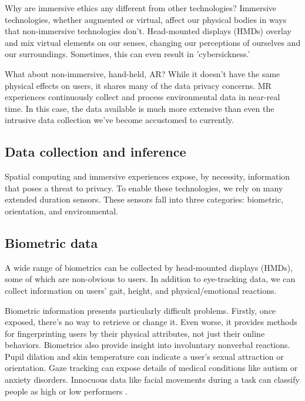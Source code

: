 Why are immersive ethics any different from other technologies? Immersive technologies, whether augmented or virtual, affect our physical bodies in ways that non-immersive technologies don't. Head-mounted displays (HMDs) overlay and mix virtual elements on our senses, changing our perceptions of ourselves and our surroundings. Sometimes, this can even result in 'cybersickness.'

What about non-immersive, hand-held, AR? While it doesn't have the same physical effects on users, it shares many of the data privacy concerns. MR experiences continuously collect and process environmental data in near-real time. In this case, the data available is much more extensive than even the intrusive data collection we've become accustomed to currently.

\subsection{Data collection and inference}
Spatial computing and immersive experiences expose, by necessity, information that poses a threat to privacy. To enable these technologies, we rely on many extended duration sensors. These sensors fall into three categories: biometric, orientation, and environmental.

\subsection{Biometric data}\label{sec:biometrics}
A wide range of biometrics can be collected by head-mounted displays (HMDs), some of which are non-obvious to users. In addition to eye-tracking data, we can collect information on users' gait, height, and physical/emotional reactions.

Biometric information presents particularly difficult problems. Firstly, once exposed, there's no way to retrieve or change it. Even worse, it provides methods for fingerprinting users by their physical attributes, not just their online behaviors. Biometrics also provide insight into involuntary nonverbal reactions\cite{bailenson2018protecting}. Pupil dilation and skin temperature can indicate a user's sexual attraction or orientation. Gaze tracking can expose details of medical conditions like autism or anxiety disorders. Innocuous data like facial movements during a task can classify people as high or low performers \cite{jabon2011automatically}.

